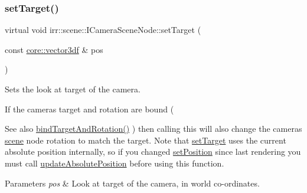 \mbox{\label{classirr_1_1scene_1_1ICameraSceneNode_a7280b07fd7915c64350db5a132b4ba07}} 
\subsubsection{\texorpdfstring{set\+Target()}{setTarget()}\hspace{0.1cm}{\footnotesize\ttfamily [1/2]}}
{\footnotesize\ttfamily virtual void irr\+::scene\+::\+I\+Camera\+Scene\+Node\+::set\+Target (\begin{DoxyParamCaption}\item[{const \hyperlink{namespaceirr_1_1core_ae6e2b2a6c552833ebbd5b7463d03586b}{core\+::vector3df} \&}]{pos }\end{DoxyParamCaption})\hspace{0.3cm}{\ttfamily [pure virtual]}}



Sets the look at target of the camera. 

If the camera\textquotesingle{}s target and rotation are bound ( \begin{DoxySeeAlso}{See also}
\hyperlink{classirr_1_1scene_1_1ICameraSceneNode_ad8785d7b2f730933a8d4425ac54e7205}{bind\+Target\+And\+Rotation()} ) then calling this will also change the camera\textquotesingle{}s \hyperlink{namespaceirr_1_1scene}{scene} node rotation to match the target. Note that \hyperlink{classirr_1_1scene_1_1ICameraSceneNode_a7280b07fd7915c64350db5a132b4ba07}{set\+Target} uses the current absolute position internally, so if you changed \hyperlink{classirr_1_1scene_1_1ISceneNode_a2166eb0a92cc0e46c49266f41a68ed50}{set\+Position} since last rendering you must call \hyperlink{classirr_1_1scene_1_1ISceneNode_aeb6e0dc034bb2101600ce87acbcf0f6e}{update\+Absolute\+Position} before using this function. 
\end{DoxySeeAlso}

\begin{DoxyParams}{Parameters}
{\em pos} & Look at target of the camera, in world co-\/ordinates. \\
\hline
\end{DoxyParams}
\mbox{\label{classirr_1_1scene_1_1ICameraSceneNode_a7280b07fd7915c64350db5a132b4ba07}} 

